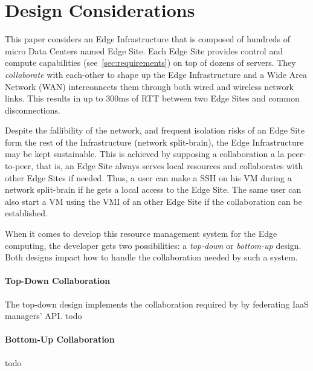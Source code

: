 

\section{Design Considerations}
\label{design_considerations}
This paper considers an Edge Infrastructure that is composed of
hundreds of micro Data Centers named Edge Site. Each Edge Site
provides control and compute capabilities (see~\ref{sec:requirements})
on top of dozens of servers. They \emph{collaborate} with each-other
to shape up the Edge Infrastructure and a Wide Area Network (WAN)
interconnects them through both wired and wireless network links. This
results in up to 300ms of RTT between two Edge Sites and common
disconnections.

Despite the fallibility of the network, and frequent isolation risks
of an Edge Site form the rest of the Infrastructure (\ie network
split-brain), the Edge Infrastructure may be kept sustainable. This is
achieved by supposing a collaboration a la peer-to-peer, that is, an
Edge Site always serves local resources and collaborates with other
Edge Sites if needed. Thus, a user can make a SSH on his VM during a
network split-brain if he gets a local access to the Edge Site. The
same user can also start a VM using the VMI of an other Edge Site if
the collaboration can be established.

When it comes to develop this resource management system for the Edge
computing, the developer gets two possibilities: a \emph{top-down} or
\emph{bottom-up} design. Both designs impact how to handle the
collaboration needed by such a system.

\paragraph{Top-Down Collaboration}
The top-down design implements the collaboration required by by
federating IaaS managers' API. todo

\paragraph{Bottom-Up Collaboration} todo

